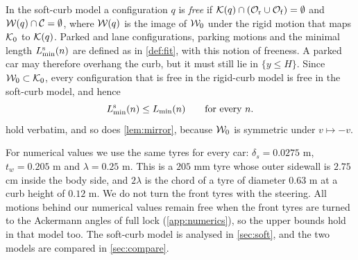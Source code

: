 In the soft-curb model a configuration $q$ is \emph{free} if $\mathcal{K}(q)\cap(\mathcal{O}_{\mathrm r}\cup\mathcal{O}_{\mathrm f})=\emptyset$ and $\mathcal{W}(q)\cap\mathcal C=\emptyset$, where $\mathcal{W}(q)$ is the image of $\mathcal{W}_0$ under the rigid motion that maps $\mathcal{K}_0$ to $\mathcal{K}(q)$.
Parked and lane configurations, parking motions and the minimal length $L^{\mathrm s}_{\min}(n)$ are defined as in \cref{def:fit}, with this notion of freeness.
A parked car may therefore overhang the curb, but it must still lie in $\{y\le H\}$.
Since $\mathcal{W}_0\subset\mathcal{K}_0$, every configuration that is free in the rigid-curb model is free in the soft-curb model, and hence
\begin{equation}\label{eq:soft-le}
  L^{\mathrm s}_{\min}(n)\le L_{\min}(n)\qquad\text{for every }n.
\end{equation}
 hold verbatim, and so does \cref{lem:mirror}, because $\mathcal{W}_0$ is symmetric under $v\mapsto-v$.

For numerical values we use the same tyres for every car: $\delta_s=0.0275$ m, $t_w=0.205$ m and $\lambda=0.25$ m.
This is a $205$ mm tyre whose outer sidewall is $2.75$ cm inside the body side, and $2\lambda$ is the chord of a tyre of diameter $0.63$ m at a curb height of $0.12$ m.
We do not turn the front tyres with the steering.
All motions behind our numerical values remain free when the front tyres are turned to the Ackermann angles of full lock (\cref{app:numerics}), so the upper bounds hold in that model too.
The soft-curb model is analysed in \cref{sec:soft}, and the two models are compared in \cref{sec:compare}.
